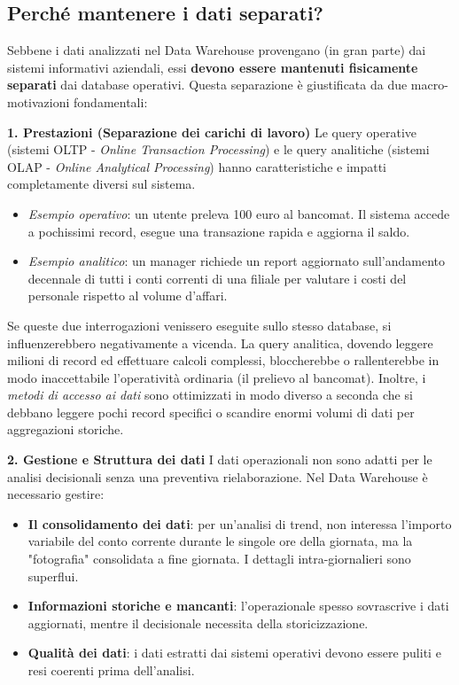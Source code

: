 \subsection{Perché mantenere i dati separati?}
Sebbene i dati analizzati nel Data Warehouse provengano (in gran parte) dai sistemi informativi aziendali, essi \textbf{devono essere mantenuti fisicamente separati} dai database operativi. Questa separazione è giustificata da due macro-motivazioni fondamentali:

\textbf{1. Prestazioni (Separazione dei carichi di lavoro)}
Le query operative (sistemi OLTP - \textit{Online Transaction Processing}) e le query analitiche (sistemi OLAP - \textit{Online Analytical Processing}) hanno caratteristiche e impatti completamente diversi sul sistema.
\begin{itemize}
\item \textit{Esempio operativo}: un utente preleva 100 euro al bancomat. Il sistema accede a pochissimi record, esegue una transazione rapida e aggiorna il saldo.
\item \textit{Esempio analitico}: un manager richiede un report aggiornato sull'andamento decennale di tutti i conti correnti di una filiale per valutare i costi del personale rispetto al volume d'affari.
\end{itemize}
Se queste due interrogazioni venissero eseguite sullo stesso database, si influenzerebbero negativamente a vicenda. La query analitica, dovendo leggere milioni di record ed effettuare calcoli complessi, bloccherebbe o rallenterebbe in modo inaccettabile l'operatività ordinaria (il prelievo al bancomat). Inoltre, i \textit{metodi di accesso ai dati} sono ottimizzati in modo diverso a seconda che si debbano leggere pochi record specifici o scandire enormi volumi di dati per aggregazioni storiche.

\textbf{2. Gestione e Struttura dei dati}
I dati operazionali non sono adatti per le analisi decisionali senza una preventiva rielaborazione.
Nel Data Warehouse è necessario gestire:
\begin{itemize}
\item \textbf{Il consolidamento dei dati}: per un'analisi di trend, non interessa l'importo variabile del conto corrente durante le singole ore della giornata, ma la "fotografia" consolidata a fine giornata. I dettagli intra-giornalieri sono superflui.
\item \textbf{Informazioni storiche e mancanti}: l'operazionale spesso sovrascrive i dati aggiornati, mentre il decisionale necessita della storicizzazione.
\item \textbf{Qualità dei dati}: i dati estratti dai sistemi operativi devono essere puliti e resi coerenti prima dell'analisi.
\end{itemize}

